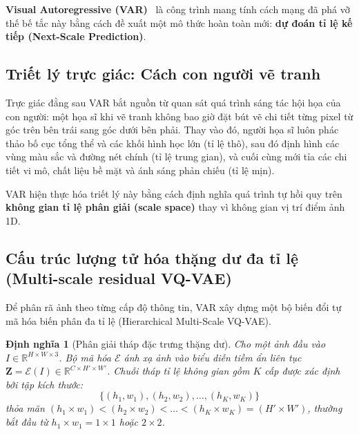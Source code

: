 \documentclass[10pt,twocolumn,letterpaper]{article}
\newtheorem{definition}{Định nghĩa}
\begin{document}
\textbf{Visual Autoregressive (VAR)}~\cite{tian2024visual} là công trình mang tính cách mạng đã phá vỡ thế bế tắc này bằng cách đề xuất một mô thức hoàn toàn mới: \textbf{dự đoán tỉ lệ kế tiếp (Next-Scale Prediction)}.

\subsection{Triết lý trực giác: Cách con người vẽ tranh}
Trực giác đằng sau VAR bắt nguồn từ quan sát quá trình sáng tác hội họa của con người: một họa sĩ khi vẽ tranh không bao giờ đặt bút vẽ chi tiết từng pixel từ góc trên bên trái sang góc dưới bên phải. Thay vào đó, người họa sĩ luôn phác thảo bố cục tổng thể và các khối hình học lớn (tỉ lệ thô), sau đó định hình các vùng màu sắc và đường nét chính (tỉ lệ trung gian), và cuối cùng mới tỉa các chi tiết vi mô, chất liệu bề mặt và ánh sáng phản chiếu (tỉ lệ mịn).

VAR hiện thực hóa triết lý này bằng cách định nghĩa quá trình tự hồi quy trên \textbf{không gian tỉ lệ phân giải (scale space)} thay vì không gian vị trí điểm ảnh 1D.

\subsection{Cấu trúc lượng tử hóa thặng dư đa tỉ lệ (Multi-scale residual VQ-VAE)}
Để phân rã ảnh theo từng cấp độ thông tin, VAR xây dựng một bộ biến đổi tự mã hóa biến phân đa tỉ lệ (Hierarchical Multi-Scale VQ-VAE).

\begin{definition}[Phân giải tháp đặc trưng thặng dư]
Cho một ảnh đầu vào $I \in \mathbb{R}^{H \times W \times 3}$. Bộ mã hóa $\mathcal{E}$ ánh xạ ảnh vào biểu diễn tiềm ẩn liên tục $\mathbf{Z} = \mathcal{E}(I) \in \mathbb{R}^{C \times H' \times W'}$.
Chuỗi tháp tỉ lệ không gian gồm $K$ cấp được xác định bởi tập kích thước:
\begin{equation}
\{(h_1, w_1), (h_2, w_2), \dots, (h_K, w_K)\}
\end{equation}
thỏa mãn $(h_1 \times w_1) < (h_2 \times w_2) < \dots < (h_K \times w_K) = (H' \times W')$, thường bắt đầu từ $h_1 \times w_1 = 1 \times 1$ hoặc $2 \times 2$.
\end{definition}
\end{document}
